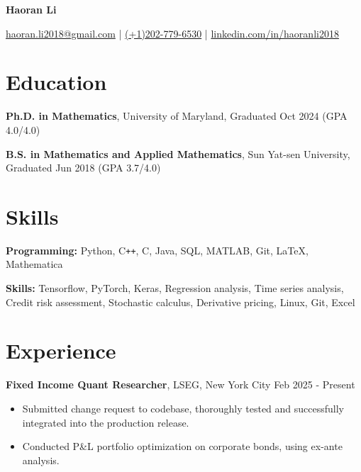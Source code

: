 \documentclass[6pt, letterpaper]{article}
\newenvironment{customItem}{
\begin{itemize}[
    topsep=0.05 cm,
    parsep=0.05 cm,
    partopsep=0pt,
    itemsep=0pt,
    leftmargin=10pt
]
}{
\end{itemize}
} %
\begin{document}
{\centering

\Huge \textbf{Haoran Li} \\

\vspace{.1cm}

\normalsize
\href{mailto:haoran.li2018@gmail.com}{\textsf{haoran.li2018@gmail.com}}
|
\href{tel:2027796530}{\textsf{(+1)202-779-6530}}
|
\href{https://linkedin.com/in/haoranli2018}{\textsf{linkedin.com/in/haoranli2018}}

}

\section{Education}

\textbf{Ph.D. in Mathematics}, University of Maryland, Graduated Oct 2024 (GPA 4.0/4.0)

\textbf{B.S. in Mathematics and Applied Mathematics}, Sun Yat-sen University, Graduated Jun 2018 (GPA 3.7/4.0)

\section{Skills}

\textbf{Programming:} Python, C\texttt{++}, C, Java, SQL, MATLAB, Git, \LaTeX, Mathematica

\textbf{Skills:} Tensorflow, PyTorch, Keras, Regression analysis, Time series analysis, Credit risk assessment, Stochastic calculus, Derivative pricing, Linux, Git, Excel

\section{Experience}

\textbf{Fixed Income Quant Researcher}, LSEG, New York City \hfill Feb 2025 - Present
\begin{customItem}
\item Submitted change request to codebase, thoroughly tested and successfully integrated into the production release.
\item Conducted P\&L portfolio optimization on corporate bonds, using ex-ante analysis.
\end{customItem}
\end{document}
